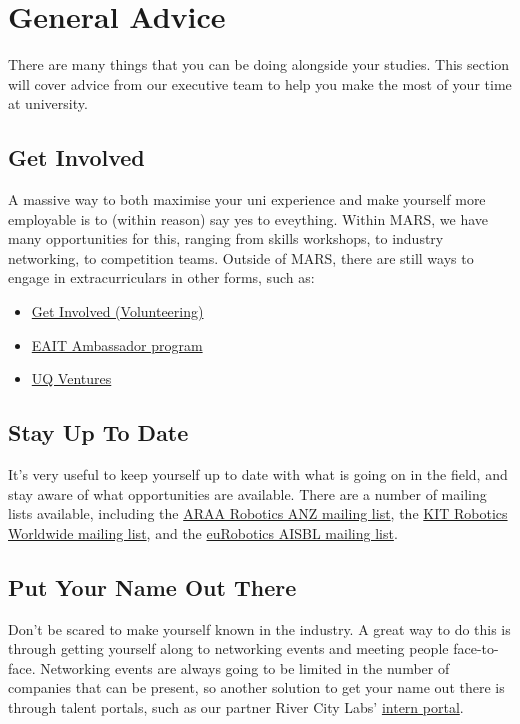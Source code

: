 \chapter{General Advice}
There are many things that you can be doing alongside your studies. This section will cover advice from our executive team to help you make the most of your time at university.

\section{Get Involved}
A massive way to both maximise your uni experience and make yourself more employable is to (within reason) say yes to eveything. Within MARS, we have many opportunities for this, ranging from skills workshops, to industry networking, to competition teams. Outside of MARS, there are still ways to engage in extracurriculars in other forms, such as:
\begin{itemize}
    \item \href{https://life.uq.edu.au/get-involved}{Get Involved (Volunteering)}
    \item \href{https://www.eait.uq.edu.au/current-students/eait-ambassadors}{EAIT Ambassador program}
    \item \href{https://ventures.uq.edu.au/}{UQ Ventures}
\end{itemize}

\section{Stay Up To Date}
It's very useful to keep yourself up to date with what is going on in the field, and stay aware of what opportunities are available. There are a number of mailing lists available, including the \href{https://lists.csiro.au/mailman/listinfo/robotics-australia-nz-list}{ARAA Robotics ANZ mailing list}, the \href{https://www.lists.kit.edu/sympa/info/robotics-worldwide}{KIT Robotics Worldwide mailing list}, and the \href{http://mailing.eu-robotics.net/info/community}{euRobotics AISBL mailing list}.

\section{Put Your Name Out There}
Don't be scared to make yourself known in the industry. A great way to do this is through getting yourself along to networking events and meeting people face-to-face. Networking events are always going to be limited in the number of companies that can be present, so another solution to get your name out there is through talent portals, such as our partner River City Labs' \href{https://rivercitylabs.acs.org.au/programs/internship-program.html}{intern portal}.
